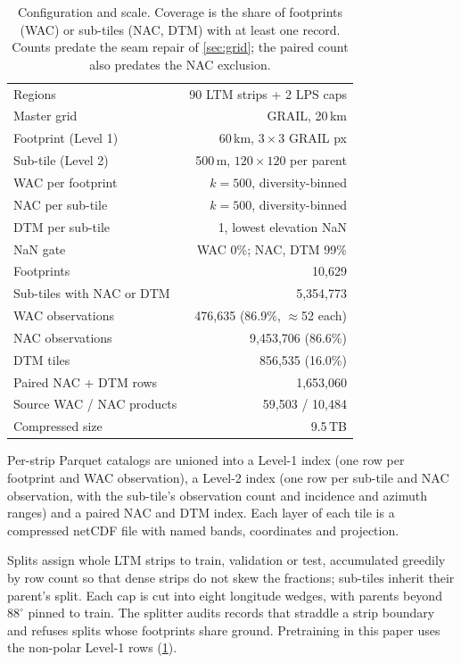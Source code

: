 \begin{table}[t]
  \centering
  \footnotesize
  \setlength{\tabcolsep}{4pt}
  \caption{Configuration and scale. Coverage is the share of footprints (WAC) or sub-tiles (NAC, DTM) with at least one record. Counts predate the seam repair of \cref{sec:grid}; the paired count also predates the NAC exclusion.}
  \label{tab:corpus}
  \begin{tabular}{@{}lr@{}}
    \toprule
    Regions                    & 90 LTM strips + 2 LPS caps \\
    Master grid                & GRAIL, 20\,km \\
    Footprint (Level 1)        & 60\,km, $3\times3$ GRAIL px \\
    Sub-tile (Level 2)         & 500\,m, $120\times120$ per parent \\
    WAC per footprint          & $k{=}500$, diversity-binned \\
    NAC per sub-tile           & $k{=}500$, diversity-binned \\
    DTM per sub-tile           & 1, lowest elevation NaN \\
    NaN gate                   & WAC 0\%; NAC, DTM 99\% \\
    \midrule
    Footprints                 & 10,629 \\
    Sub-tiles with NAC or DTM  & 5,354,773 \\
    WAC observations           & 476,635 (86.9\%, $\approx$52 each) \\
    NAC observations           & 9,453,706 (86.6\%) \\
    DTM tiles                  & 856,535 (16.0\%) \\
    Paired NAC + DTM rows      & 1,653,060 \\
    Source WAC / NAC products  & 59,503 / 10,484 \\
    Compressed size            & 9.5\,TB \\
    \bottomrule
  \end{tabular}
\end{table}

Per-strip Parquet catalogs are unioned into a Level-1 index (one row per footprint and WAC observation), a Level-2 index (one row per sub-tile and NAC observation, with the sub-tile's observation count and incidence and azimuth ranges) and a paired NAC and DTM index. Each layer of each tile is a compressed netCDF file with named bands, coordinates and projection.

Splits assign whole LTM strips to train, validation or test, accumulated greedily by row count so that dense strips do not skew the fractions; sub-tiles inherit their parent's split. Each cap is cut into eight longitude wedges, with parents beyond $88^\circ$ pinned to train. The splitter audits records that straddle a strip boundary and refuses splits whose footprints share ground. Pretraining in this paper uses the non-polar Level-1 rows (\cref{tab:corpus}). 

